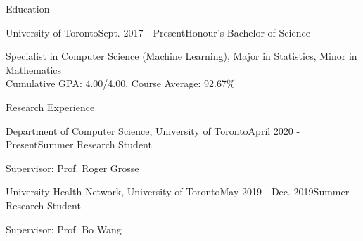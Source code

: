 \documentclass{resume} %
\begin{document}

\begin{rSection}{Education}
\begin{rSubsection}{University of Toronto}{Sept. 2017 - Present}{Honour's Bachelor of Science}{}
\item
Specialist in Computer Science (Machine Learning), Major in Statistics, Minor in Mathematics\\
Cumulative GPA: 4.00/4.00, Course Average: 92.67\%
\end{rSubsection}
\end{rSection}



\begin{rSection}{Research Experience}
\begin{rSubsection}{Department of Computer Science, University of Toronto}{April 2020 - Present}{Summer Research Student}{}
\item
Supervisor: Prof. Roger Grosse
\end{rSubsection}
\begin{rSubsection}{University Health Network, University of Toronto}{May 2019 - Dec. 2019}{Summer Research Student}{}
\item
Supervisor: Prof. Bo Wang
\end{rSubsection}
\end{rSection}
\end{document}
